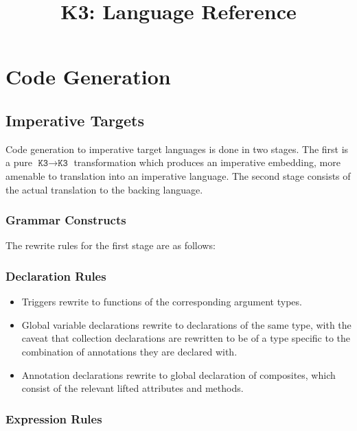\documentclass{article}
\title{K3: Language Reference}
\author{}
\date{}
\newcommand{\K}{\texttt{K3}}
\begin{document}
    \maketitle

    \tableofcontents

    \section{Code Generation}
    \subsection{Imperative Targets}

    Code generation to imperative target languages is done in two stages. The first is a pure $\K
    \rightarrow \K$ transformation which produces an imperative embedding, more amenable to
    translation into an imperative language. The second stage consists of the actual translation to
    the backing language.

    \subsubsection{Grammar Constructs}

    The rewrite rules for the first stage are as follows:

    \subsubsection{Declaration Rules}

    \begin{itemize}
        \item Triggers rewrite to functions of the corresponding argument types.
        \item Global variable declarations rewrite to declarations of the same type, with the caveat
            that collection declarations are rewritten to be of a type specific to the combination
            of annotations they are declared with.
        \item Annotation declarations rewrite to global declaration of composites, which consist of
            the relevant lifted attributes and methods.
    \end{itemize}
    \subsubsection{Expression Rules}
\end{document}
